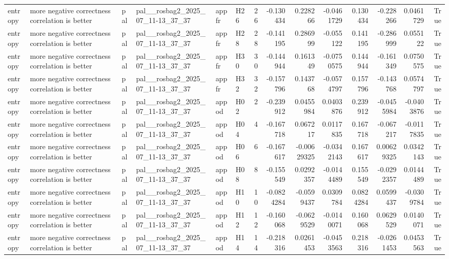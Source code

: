 \begin{longtable}{llllllrrrrrrrr}
entropy & more negative correctness correlation is better & pal & pal\_\_rosbag2\_2025\_07\_11-13\_37\_37 & appfr & H26 & 26 & -0.130434 & 0.228266 & -0.0461729 & 0.130434 & -0.228266 & 0.0461729 & True \\
entropy & more negative correctness correlation is better & pal & pal\_\_rosbag2\_2025\_07\_11-13\_37\_37 & appfr & H28 & 28 & -0.141195 & 0.286999 & -0.055122 & 0.141195 & -0.286999 & 0.055122 & True \\
entropy & more negative correctness correlation is better & pal & pal\_\_rosbag2\_2025\_07\_11-13\_37\_37 & appfr & H30 & 30 & -0.144944 & 0.161349 & -0.0750575 & 0.144944 & -0.161349 & 0.0750575 & True \\
entropy & more negative correctness correlation is better & pal & pal\_\_rosbag2\_2025\_07\_11-13\_37\_37 & appfr & H32 & 32 & -0.157796 & 0.143768 & -0.0574797 & 0.157796 & -0.143768 & 0.0574797 & True \\
entropy & more negative correctness correlation is better & pal & pal\_\_rosbag2\_2025\_07\_11-13\_37\_37 & appod & H02 & 2 & -0.239912 & 0.0455984 & 0.0403876 & 0.239912 & -0.0455984 & -0.0403876 & True \\
entropy & more negative correctness correlation is better & pal & pal\_\_rosbag2\_2025\_07\_11-13\_37\_37 & appod & H04 & 4 & -0.167718 & 0.067217 & 0.0117835 & 0.167718 & -0.067217 & -0.0117835 & True \\
entropy & more negative correctness correlation is better & pal & pal\_\_rosbag2\_2025\_07\_11-13\_37\_37 & appod & H06 & 6 & -0.167617 & -0.00629325 & -0.0342143 & 0.167617 & 0.00629325 & 0.0342143 & True \\
entropy & more negative correctness correlation is better & pal & pal\_\_rosbag2\_2025\_07\_11-13\_37\_37 & appod & H08 & 8 & -0.155549 & 0.0292357 & -0.0144489 & 0.155549 & -0.0292357 & 0.0144489 & True \\
entropy & more negative correctness correlation is better & pal & pal\_\_rosbag2\_2025\_07\_11-13\_37\_37 & appod & H10 & 10 & -0.0824284 & -0.0599437 & 0.0309784 & 0.0824284 & 0.0599437 & -0.0309784 & True \\
entropy & more negative correctness correlation is better & pal & pal\_\_rosbag2\_2025\_07\_11-13\_37\_37 & appod & H12 & 12 & -0.160068 & -0.0629529 & -0.0140071 & 0.160068 & 0.0629529 & 0.0140071 & True \\
entropy & more negative correctness correlation is better & pal & pal\_\_rosbag2\_2025\_07\_11-13\_37\_37 & appod & H14 & 14 & -0.218316 & 0.0261453 & -0.0453563 & 0.218316 & -0.0261453 & 0.0453563 & True \\

\end{longtable}
